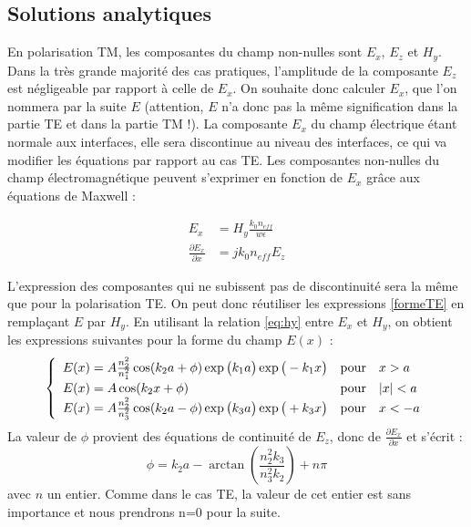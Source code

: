 \documentclass[a4paper, 12pt]{article}
\begin{document}
\subsection{Solutions analytiques}

En polarisation TM, les composantes du champ non-nulles sont $E_x$, $E_z$ et $H_y$. Dans la très grande majorité des cas pratiques, l'amplitude de la composante $E_z$ est négligeable par rapport à celle de $E_x$. On souhaite donc calculer $E_x$, que l'on nommera par la suite $E$ (attention, $E$ n'a donc pas la même signification dans la partie TE et dans la partie TM !). La composante $E_x$ du champ électrique étant normale aux interfaces, elle sera discontinue au niveau des interfaces, ce qui va modifier les équations par rapport au cas TE. Les composantes non-nulles du champ électromagnétique peuvent s'exprimer en fonction de $E_x$ grâce aux équations de Maxwell :

\begin{align}
    E_x &= H_y\frac{k_0n_{ef\!f}}{w\epsilon} \label{eq:hy} \\
    \frac{\partial E_x}{\partial x} &= jk_0 n_{ef\!f} E_z \label{eq:ez} 
\end{align}

L'expression des composantes qui ne subissent pas de discontinuité sera la même que pour la polarisation TE. On peut donc réutiliser les expressions \ref{formeTE} en remplaçant $E$ par $H_y$. En utilisant la relation \ref{eq:hy} entre $E_x$ et $H_y$, on obtient les expressions suivantes pour la forme du champ $E(x)$ :
\begin{equation} \label{formeTM}
\left\{
\renewcommand*{\arraystretch}{1.2}
  \begin{array}{lcl}
E(x)=A \frac{n_2^2}{n_1^2}\cos(k_2 a+\phi) \exp \big(k_1 a \big) \exp \big(-k_1 x \big)  & \text{pour} & x>a \\
E(x)=A \cos(k_2 x+\phi) & \text{pour} & |x|<a \\
E(x)=A \frac{n_2^2}{n_3^2}\cos(k_2 a-\phi) \exp \big(k_3 a \big) \exp \big(+k_3 x \big)  & \text{pour} & x<-a
  \end{array}
\right.
\end{equation}
La valeur de $\phi$ provient des équations de continuité de $E_z$, donc de $\frac{\partial E_x}{\partial x}$ et s'écrit :
\begin{equation}
    \phi = k_2a-\arctan\left(\frac{n_2^2k_3}{n_3^2k_2}\right) + n\pi
\end{equation}
avec $n$ un entier. Comme dans le cas TE, la valeur de cet entier est sans importance et nous prendrons n=0 pour la suite.
\end{document}
